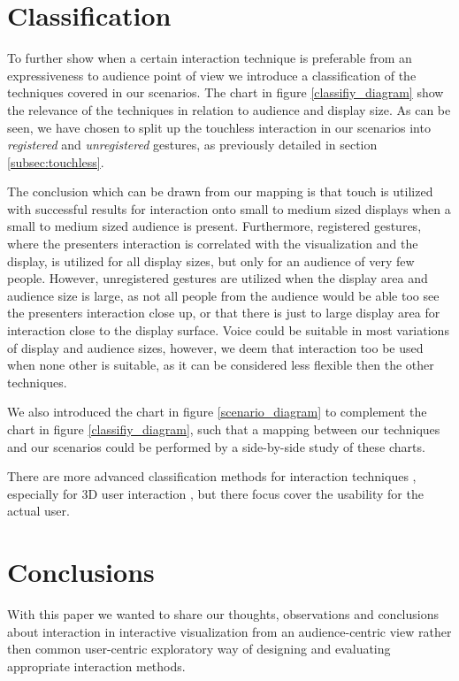 \documentclass[review,journal]{vgtc}         %
\begin{document}
\section{Classification} \label{sec:classification}

To further show when a certain interaction technique is preferable from an expressiveness to audience point of view we introduce a classification of the techniques covered in our scenarios. 
The chart in figure \ref{classifiy_diagram} show the relevance of the techniques in relation to audience and display size. 
As can be seen, we have chosen to split up the touchless interaction in our scenarios into \emph{registered} and \emph{unregistered} gestures, as previously detailed in section \ref{subsec:touchless}.

The conclusion which can be drawn from our mapping is that touch is utilized with successful results for interaction onto small to medium sized displays when a small to medium sized audience is present. 
Furthermore, registered gestures, where the presenters interaction is correlated with the visualization and the display, is utilized for all display sizes, but only for an audience of very few people.
However, unregistered gestures are utilized when the display area and audience size is large, as not all people from the audience would be able too see the presenters interaction close up, or that there is just to large display area for interaction close to the display surface.
Voice could be suitable in most variations of display and audience sizes, however, we deem that interaction too be used when none other is suitable, as it can be considered less flexible then the other techniques.

We also introduced the chart in figure \ref{scenario_diagram} to complement the chart in figure \ref{classifiy_diagram}, such that a mapping between our techniques and our scenarios could be performed by a side-by-side study of these charts.

There are more advanced classification methods for interaction techniques \cite{stars:65-93:2012}, especially for 3D user interaction \cite{CGF:CGF194, Kettner95aclassification, 978-3-319-07458-0_1}, but there focus cover the usability for the actual user.

\section{Conclusions}\label{sec:conclusion}

With this paper we wanted to share our thoughts, observations and conclusions about interaction in interactive visualization from an audience-centric view rather then common user-centric exploratory way of designing and evaluating appropriate interaction methods.
\end{document}
